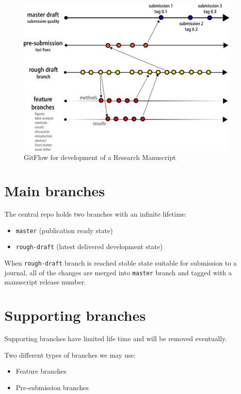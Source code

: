 \documentclass[]{book}
\providecommand{\tightlist}{%
  \setlength{\itemsep}{0pt}\setlength{\parskip}{0pt}}
\begin{document}
\begin{figure}[htbp]
\centering
\includegraphics{images/GitFlow-Science.png}
\caption{GitFlow for development of a Research Manuscript}
\end{figure}

\section{Main branches}\label{main-branches}

The central repo holds two branches with an infinite lifetime:

\begin{itemize}
\tightlist
\item
  \texttt{master} (publication ready state)
\item
  \texttt{rough-draft} (latest delivered development state)
\end{itemize}

When \texttt{rough-draft} branch is reached stable state suitable for
submission to a journal, all of the changes are merged into
\texttt{master} branch and tagged with a manuscript release number.

\section{Supporting branches}\label{supporting-branches}

Supporting branches have limited life time and will be removed
eventually.

Two different types of branches we may use:

\begin{itemize}
\tightlist
\item
  Feature branches
\item
  Pre-submission branches
\end{itemize}
\end{document}

